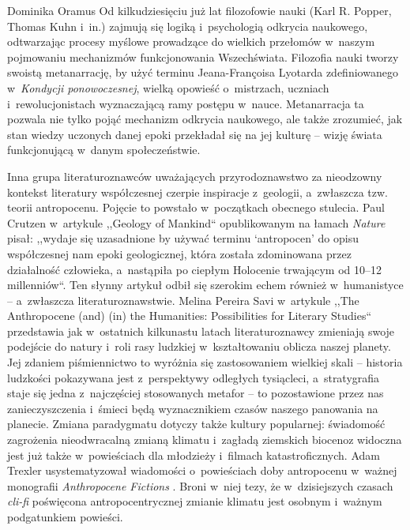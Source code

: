 \begin{artplenv}{Dominika Oramus}
Od kilkudziesięciu już lat filozofowie nauki (Karl R. Popper, Thomas Kuhn i~in.) zajmują się logiką i~psychologią odkrycia naukowego, odtwarzając procesy myślowe prowadzące do wielkich przełomów w~naszym pojmowaniu mechanizmów funkcjonowania Wszechświata. Filozofia nauki tworzy swoistą metanarrację, by użyć terminu Jeana-Françoisa Lyotarda zdefiniowanego w~\textit{Kondycji ponowoczesnej}, wielką opowieść o~mistrzach, uczniach i~rewolucjonistach wyznaczającą ramy postępu w~nauce. Metanarracja ta pozwala nie tylko pojąć mechanizm odkrycia naukowego, ale także zrozumieć, jak stan wiedzy uczonych danej epoki przekładał się na jej kulturę -- wizję świata funkcjonującą w~danym społeczeństwie.

Inna grupa literaturoznawców uważających przyrodoznawstwo za nieodzowny kontekst literatury współczesnej czerpie inspiracje z~geologii, a~zwłaszcza tzw. teorii antropocenu. Pojęcie to powstało w~początkach obecnego stulecia. Paul Crutzen w~artykule ,,Geology of Mankind``
\parencite*[][]{crutzen_geology_2002} %
opublikowanym na łamach \textit{Nature} pisał: ,,wydaje się uzasadnione by używać terminu ‘antropocen’ do opisu współczesnej nam epoki geologicznej, która została zdominowana przez działalność człowieka, a~nastąpiła po ciepłym Holocenie trwającym od 10–12 millenniów``. Ten słynny artykuł odbił się szerokim echem również w~humanistyce -- a~zwłaszcza literaturoznawstwie. Melina Pereira Savi w~artykule ,,The Anthropocene (and) (in) the Humanities: Possibilities for Literary Studies`` 
\parencite*[][]{savi_anthropocene_2017} %
 przedstawia jak w~ostatnich kilkunastu latach literaturoznawcy zmieniają swoje podejście do natury i~roli rasy ludzkiej w~kształtowaniu oblicza naszej planety. Jej zdaniem piśmiennictwo to wyróżnia się zastosowaniem wielkiej skali -- historia ludzkości pokazywana jest z~perspektywy odległych tysiącleci, a~stratygrafia staje się jedna z~najczęściej stosowanych metafor -- to pozostawione przez nas zanieczyszczenia i~śmieci będą wyznacznikiem czasów naszego panowania na planecie. Zmiana paradygmatu dotyczy także kultury popularnej: świadomość zagrożenia nieodwracalną zmianą klimatu i~zagładą ziemskich biocenoz widoczna jest już także w~powieściach dla młodzieży i~filmach katastroficznych. Adam Trexler usystematyzował wiadomości o~powieściach doby antropocenu w~ważnej monografii \textit{Anthropocene Fictions} 
\parencite*[][]{trexler_anthropocene_2015}. %
 Broni w~niej tezy, że w~dzisiejszych czasach \textit{cli-fi} poświęcona antropocentrycznej zmianie klimatu jest osobnym i~ważnym podgatunkiem powieści.


\end{artplenv}
